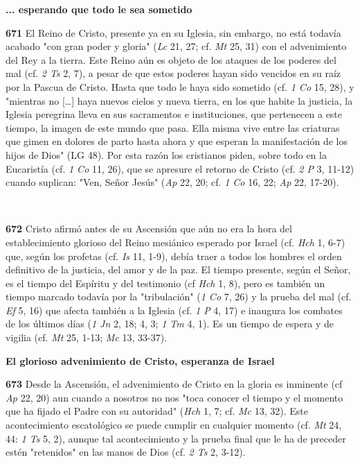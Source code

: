 \documentclass[]{article}
\begin{document}
\textbf{... esperando que todo le sea sometido}

\textbf{671} El Reino de Cristo, presente ya en su Iglesia, sin embargo, no está todavía acabado "con gran poder y gloria" (\emph{Lc} 21, 27; cf. \emph{Mt} 25, 31) con el advenimiento del Rey a la tierra. Este Reino aún es objeto de los ataques de los poderes del mal (cf. \emph{2 Ts} 2, 7), a pesar de que estos poderes hayan sido vencidos en su raíz por la Pascua de Cristo. Hasta que todo le haya sido sometido (cf. \emph{1 Co} 15, 28), y "mientras no [\ldots{}] haya nuevos cielos y nueva tierra, en los que habite la justicia, la Iglesia peregrina lleva en sus sacramentos e instituciones, que pertenecen a este tiempo, la imagen de este mundo que pasa. Ella misma vive entre las criaturas que gimen en dolores de parto hasta ahora y que esperan la manifestación de los hijos de Dios" (LG 48). Por esta razón los cristianos piden, sobre todo en la Eucaristía (cf. \emph{1 Co} 11, 26), que se apresure el retorno de Cristo (cf. \emph{2 P} 3, 11-12) cuando suplican: "Ven, Señor Jesús" (\emph{Ap} 22, 20; cf. \emph{1 Co} 16, 22; \emph{Ap} 22, 17-20).

\textbf{\\ }

\textbf{672} Cristo afirmó antes de su Ascensión que aún no era la hora del establecimiento glorioso del Reino mesiánico esperado por Israel (cf. \emph{Hch} 1, 6-7) que, según los profetas (cf. \emph{Is} 11, 1-9), debía traer a todos los hombres el orden definitivo de la justicia, del amor y de la paz. El tiempo presente, según el Señor, es el tiempo del Espíritu y del testimonio (cf \emph{Hch} 1, 8), pero es también un tiempo marcado todavía por la "tribulación" (\emph{1 Co} 7, 26) y la prueba del mal (cf. \emph{Ef} 5, 16) que afecta también a la Iglesia (cf. \emph{1 P} 4, 17) e inaugura los combates de los últimos días (\emph{1 Jn} 2, 18; 4, 3; \emph{1 Tm} 4, 1). Es un tiempo de espera y de vigilia (cf. \emph{Mt} 25, 1-13; \emph{Mc} 13, 33-37).

\textbf{El glorioso advenimiento de Cristo, esperanza de Israel}

\textbf{673} Desde la Ascensión, el advenimiento de Cristo en la gloria es inminente (cf \emph{Ap} 22, 20) aun cuando a nosotros no nos "toca conocer el tiempo y el momento que ha fijado el Padre con su autoridad" (\emph{Hch} 1, 7; cf. \emph{Mc} 13, 32). Este acontecimiento escatológico se puede cumplir en cualquier momento (cf. \emph{Mt} 24, 44: \emph{1 Ts} 5, 2), aunque tal acontecimiento y la prueba final que le ha de preceder estén "retenidos" en las manos de Dios (cf. \emph{2 	Ts} 2, 3-12).
\end{document}
